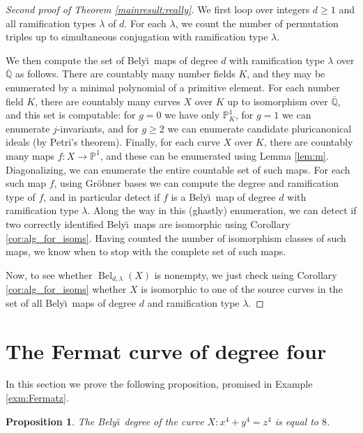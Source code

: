 \documentclass{amsproc}
\numberwithin{equation}{section}
\numberwithin{figure}{section}
\newtheorem{proposition}[equation]{Proposition}
\theoremstyle{definition}
\theoremstyle{remark}
\newcommand{\Qbar}{\overline{\mathbb{Q}}}
\newcommand\PP{\mathbb{P}}
\DeclareMathOperator{\Bel}{Bel}
\renewcommand{\geq}{\geqslant}
\newcommand{\Belyi}{Bely\u{\i}}
\newcommand{\aj}[1]{{\color{magenta} \textsf{[[#1]]}}}
\begin{document}
\begin{proof}[Second proof of Theorem \ref{mainresult:really}]
We first loop over integers $d \geq 1$ and all ramification types $\lambda$ of $d$.  For each $\lambda$, we count the number of permutation triples up to simultaneous conjugation with ramification type $\lambda$.  

We then compute the set of \Belyi\ maps of degree $d$ with ramification type $\lambda$ over $\Qbar$ as follows.  There are countably many number fields $K$, and they may be enumerated by a minimal polynomial of a primitive element.  For each number field $K$, there are countably many curves $X$ over $K$ up to isomorphism over $\Qbar$, and this set is computable: for $g=0$ we have only $\PP_K^1$, for $g=1$ we can enumerate $j$-invariants, and for $g \geq 2$ we can enumerate candidate pluricanonical ideals (by Petri's theorem).  Finally, for each curve $X$ over $K$, there are countably many maps $f\colon X \to \PP^1$, and these can be enumerated using Lemma \ref{lem:m}.  Diagonalizing, we can enumerate the entire countable set of such maps.  For each such map $f$, using Gr\"obner bases we can compute the degree and ramification type of $f$, and in particular detect if $f$ is a \Belyi\ map of degree $d$ with ramification type $\lambda$.  Along the way in this (ghastly) enumeration, we can detect if two correctly identified \Belyi\ maps are isomorphic using Corollary \ref{cor:alg_for_isoms}.  Having counted the number of isomorphism classes of such maps, we know when to stop with the complete set of such maps.

Now, to see whether $\Bel_{d,\lambda}(X)$ is nonempty, we just check  using Corollary \ref{cor:alg_for_isoms} whether $X$ is isomorphic to one of the source curves in the set of all \Belyi\ maps of degree $d$ and ramification type $\lambda$.
\end{proof}

\section{The Fermat curve of degree four} \label{section:fermat}

In this section we prove the following proposition, promised in Example \ref{exm:Fermatz}.

\begin{proposition}\label{prop:fermat}
The \Belyi\ degree of the curve $X\colon x^4+y^4 = z^4$ is equal to $8$.
\end{proposition}
\end{document}
